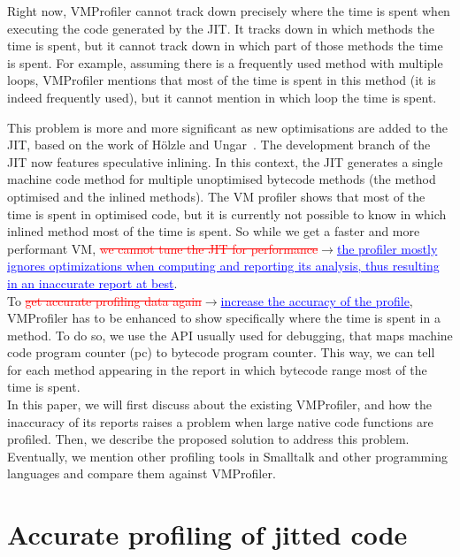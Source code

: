 \documentclass[10pt,preprint,nonatbib]{sigplanconf}
\newcommand{\ra}{$\rightarrow$}
\newcommand{\chg}[2]{\textcolor{red}{\sout{#1}}{\ra}\textcolor{blue}{\uline{#2}}} %
\begin{document}
Right now, VMProfiler cannot track down precisely where the time is spent when executing the code generated by the JIT. It tracks down in which methods the time is spent, but it cannot track down in which part of those methods the time is spent. For example, assuming there is a frequently used method with multiple loops, VMProfiler mentions that most of the time is spent in this method (it is indeed frequently used), but it cannot mention in which loop the time is spent.

This problem is more and more significant as new optimisations are added to the JIT, based on the work of H\"olzle and Ungar~\cite{Holz94a}. The development branch of the JIT now features speculative inlining. In this context, the JIT generates a single machine code method for multiple unoptimised bytecode methods (the method optimised and the inlined methods). The VM profiler shows that most of the time is spent in optimised code, but it is currently not possible to know in which inlined method most of the time is spent. So while we get a faster and more performant VM, \chg{we cannot tune the JIT for performance}{the profiler mostly ignores optimizations when computing and reporting its analysis, thus resulting in an inaccurate report at best}.\\

To \chg{get accurate profiling data again}{increase the accuracy of the profile}, VMProfiler has to be enhanced to show specifically where the time is spent in a method. To do so, we use the API usually used for debugging, that maps machine code program counter (pc) to bytecode program counter. This way, we can tell for each method appearing in the report in which bytecode range most of the time is spent.\\

In this paper, we will first discuss about the existing VMProfiler, and how the inaccuracy of its reports raises a problem when large native code functions are profiled. Then, we describe the proposed solution to address this problem. Eventually, we mention other profiling tools in Smalltalk and other programming languages and compare them against VMProfiler.



\section{Accurate profiling of jitted code}
\end{document}
